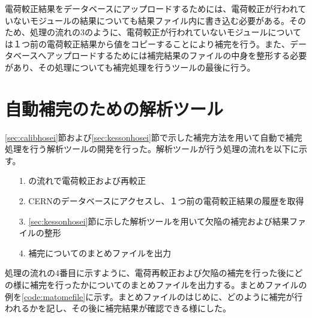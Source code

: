電荷較正結果をデータベースにアップロードするためには、電荷較正が行われていないモジュールの結果についても結果ファイル内に書き込む必要がある。そのため、処理の流れの3のように、電荷較正が行われていないモジュールについては１つ前の電荷較正結果から値をコピーすることにより補完を行う。また、データベースへアップロードするためには補完結果のファイルの中身を整形する必要があり、その処理についても補完処理を行うツールの最後に行う。

\section{自動補完のための解析ツール}
\label{sec:kaisekitool}
\ref{sec:calibhosei}節および\ref{sec:kessonhosei}節で示した補完方法を用いて自動で補完処理を行う解析ツールの開発を行った。解析ツールが行う処理の流れを以下に示す。

\begin{itemize}
  \item[1. ] の流れで電荷較正および再較正
  \item[2. ] CERNのデータベースにアクセスし、１つ前の電荷較正結果の履歴を取得
  \item[3. ] \ref{sec:kessonhosei}節に示した解析ツールを用いて欠陥の補完および結果ファイルの整形
  \item[4. ] 補完についてのまとめファイルを出力
\end{itemize}

処理の流れの4番目に示すように、電荷再較正および欠陥の補完を行った後にどの様に補完を行ったかについてのまとめファイルを出力する。まとめファイルの例を\cref{code:matomefile}に示す。まとめファイルのはじめに、どのように補完が行われるかを記し、その後に補完結果が確認できる様にした。

